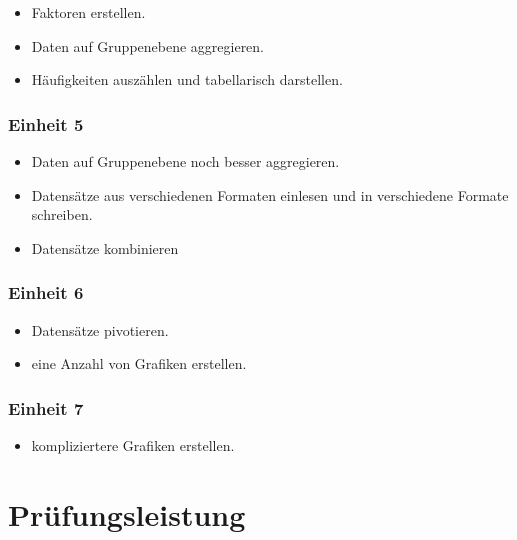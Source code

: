 \documentclass[
]{book}
\providecommand{\tightlist}{%
  \setlength{\itemsep}{0pt}\setlength{\parskip}{0pt}}
\begin{document}
\begin{itemize}
\tightlist
\item
  Faktoren erstellen.
\item
  Daten auf Gruppenebene aggregieren.
\item
  Häufigkeiten auszählen und tabellarisch darstellen.
\end{itemize}

\hypertarget{einheit-5}{%
\subsubsection*{Einheit 5}\label{einheit-5}}

\begin{itemize}
\tightlist
\item
  Daten auf Gruppenebene noch besser aggregieren.
\item
  Datensätze aus verschiedenen Formaten einlesen und in verschiedene Formate schreiben.
\item
  Datensätze kombinieren
\end{itemize}

\hypertarget{einheit-6}{%
\subsubsection*{Einheit 6}\label{einheit-6}}

\begin{itemize}
\tightlist
\item
  Datensätze pivotieren.
\item
  eine Anzahl von Grafiken erstellen.
\end{itemize}

\hypertarget{einheit-7}{%
\subsubsection*{Einheit 7}\label{einheit-7}}

\begin{itemize}
\tightlist
\item
  kompliziertere Grafiken erstellen.
\end{itemize}

\hypertarget{pruxfcfungsleistung}{%
\section{Prüfungsleistung}\label{pruxfcfungsleistung}}
\end{document}
